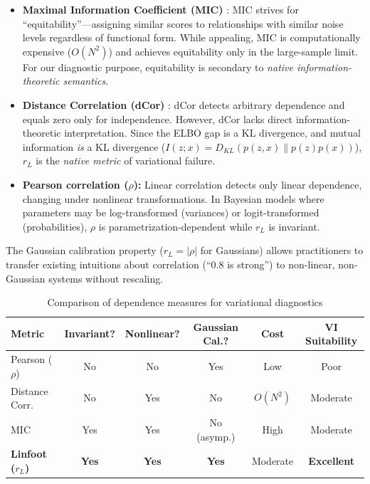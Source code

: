 \documentclass[10pt]{article} %
\theoremstyle{plain}
\theoremstyle{definition}
\begin{document}
\begin{itemize}
    \item \textbf{Maximal Information Coefficient (MIC)} \citep{reshef2011detecting}: MIC strives for ``equitability''---assigning similar scores to relationships with similar noise levels regardless of functional form. While appealing, MIC is computationally expensive ($O(N^2)$) and achieves equitability only in the large-sample limit. For our diagnostic purpose, equitability is secondary to \emph{native information-theoretic semantics}.
    
    \item \textbf{Distance Correlation (dCor)} \citep{szekely2007measuring}: dCor detects arbitrary dependence and equals zero only for independence. However, dCor lacks direct information-theoretic interpretation. Since the ELBO gap is a KL divergence, and mutual information \emph{is} a KL divergence ($I(z;x) = D_{KL}(p(z,x) \| p(z)p(x))$), $r_L$ is the \emph{native metric} of variational failure.
    
    \item \textbf{Pearson correlation ($\rho$):} Linear correlation detects only linear dependence, changing under nonlinear transformations. In Bayesian models where parameters may be log-transformed (variances) or logit-transformed (probabilities), $\rho$ is parametrization-dependent while $r_L$ is invariant.
\end{itemize}

\noindent The Gaussian calibration property ($r_L = |\rho|$ for Gaussians) allows practitioners to transfer existing intuitions about correlation (``0.8 is strong'') to non-linear, non-Gaussian systems without rescaling.

\begin{table}[!htbp]
\centering
\caption{Comparison of dependence measures for variational diagnostics}
\label{tab:metrics}
\small
\begin{tabular}{lccccc}
\toprule
\textbf{Metric} & \textbf{Invariant?} & \textbf{Nonlinear?} & \textbf{Gaussian Cal.?} & \textbf{Cost} & \textbf{VI Suitability} \\
\midrule
Pearson ($\rho$) & No & No & Yes & Low & Poor \\
Distance Corr. & No & Yes & No & $O(N^2)$ & Moderate \\
MIC & Yes & Yes & No (asymp.) & High & Moderate \\
\textbf{Linfoot ($r_L$)} & \textbf{Yes} & \textbf{Yes} & \textbf{Yes} & Moderate & \textbf{Excellent} \\
\bottomrule
\end{tabular}
\end{table}
\end{document}
